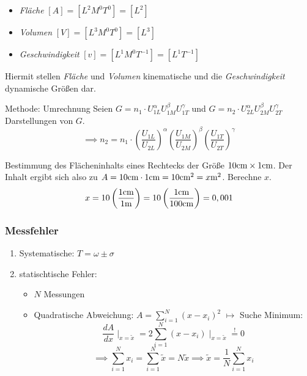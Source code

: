 \documentclass[a4paper,10pt]{scrartcl}
\begin{document}
\begin{ex}

\begin{itemize}
 \item \emph{Fläche} $[A]=[L^2 M^0 T^0]=[L^2]$
 \item \emph{Volumen} $[V]=[L^3M^0T^0]=[L^3]$
 \item \emph{Geschwindigkeit} $[v]=[L^1M^0T^{-1}]=[L^1 T^{-1}]$
\end{itemize}
Hiermit stellen \emph{Fläche} und \emph{Volumen} kinematische und die \emph{Geschwindigkeit} dynamische Größen dar.
\end{ex}
\newpage  
\begin{seg}{Methode: Umrechnung}
 Seien $G=n_1\cdot U_{1L}^\alpha U_{1M}^\beta U_{1T}^\gamma$ und $G=n_2\cdot U_{2L}^\alpha U_{2M}^\beta U_{2T}^\gamma$ Darstellungen von $G$.
 \[
  \implies n_2=n_1 \cdot \left ( \frac{U_{1L}}{U_{2L}} \right )^\alpha \left ( \frac{U_{1M}}{U_{2M}} \right )^\beta \left ( \frac{U_{1T}}{U_{2T}} \right )^\gamma
 \]
\end{seg}
\begin{ex}
 Bestimmung des Flächeninhalts eines Rechtecks der Größe $10 \text{cm} \times 1\text{cm}$.  Der Inhalt ergibt sich also zu $A=10\text{cm}\cdot 1 \text{cm}=10\text{cm}^2=x\text{m}^2$.  Berechne $x$.
\[
 x=10 \left ( \frac{1 \text{cm}}{1 \text{m}} \right ) = 10 \left ( \frac{1 \text{cm}}{100 \text{cm}} \right )=0,001
\]

\end{ex}

\subsubsection{Messfehler}
\begin{enumerate}
 \item Systematische: $T=\omega \pm \sigma$
 \item statischtische Fehler:\\
 \begin{itemize}
  \item $N$ Messungen
  \item Quadratische Abweichung: $A=\sum_{i=1}^{N}(x-x_i)^2$
\subitem $\mapsto$ Suche Minimum:
\[
 \frac{dA}{dx} \mid_{x=\tilde x}=2 \sum_{i=1}^N(x-x_i) \mid_{x=\tilde x}\stackrel{!}{=}0
\]
\[
  \implies \sum_{i=1}^N x_i=\sum_{i=1}^N \tilde x=N\tilde x \implies \tilde x=\frac{1}{N}  \sum_{i=1}^N x_i
\]


 \end{itemize}

\end{enumerate}
\end{document}
